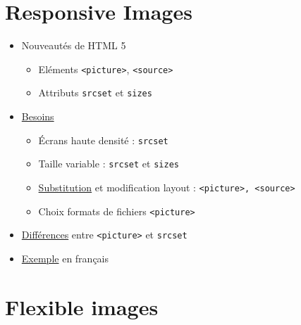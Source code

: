 \hypertarget{responsive-images}{%
\section{Responsive Images}\label{responsive-images}}

\begin{itemize}
\tightlist
\item
  Nouveautés de HTML 5

  \begin{itemize}
  \tightlist
  \item
    Eléments \textenglish{\texttt{\textless{}picture\textgreater{}}},
    \textenglish{\texttt{\textless{}source\textgreater{}}}
  \item
    Attributs \textenglish{\texttt{srcset}} et
    \textenglish{\texttt{sizes}}
  \end{itemize}
\item
  \href{http://www.smashingmagazine.com/2014/05/14/responsive-images-done-right-guide-picture-srcset/}{Besoins}

  \begin{itemize}
  \tightlist
  \item
    Écrans haute densité : \textenglish{\texttt{srcset}}
  \item
    Taille variable : \textenglish{\texttt{srcset}} et
    \textenglish{\texttt{sizes}}
  \item
    \href{http://ericportis.com/etc/smashing-mag-picture-examples/art-direction.html}{Substitution}
    et modification layout :
    \textenglish{\texttt{\textless{}picture\textgreater{},\ \textless{}source\textgreater{}}}
  \item
    Choix formats de fichiers
    \textenglish{\texttt{\textless{}picture\textgreater{}}}
  \end{itemize}
\item
  \href{https://css-tricks.com/responsive-images-youre-just-changing-resolutions-use-srcset/}{Différences}
  entre \textenglish{\texttt{\textless{}picture\textgreater{}}} et
  \textenglish{\texttt{srcset}}
\item
  \href{http://www.hteumeuleu.fr/attribut-srcset-images-responsive/}{Exemple}
  en français
\end{itemize}

\hypertarget{flexible-images}{%
\section{Flexible images}\label{flexible-images}}

